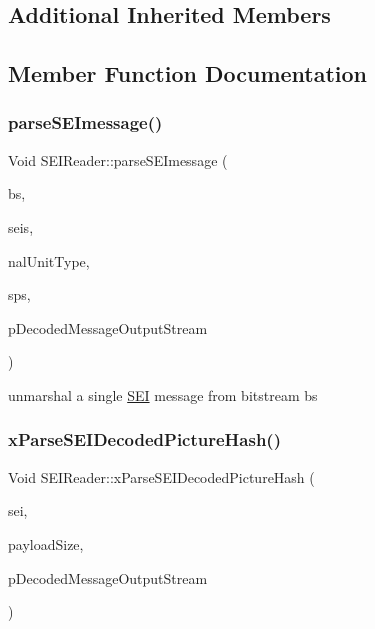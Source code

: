 \subsection*{Additional Inherited Members}


\subsection{Member Function Documentation}
\mbox{\label{class_s_e_i_reader_aef2fb8032997b770594af56676ee34be}} 
\subsubsection{\texorpdfstring{parse\+S\+E\+Imessage()}{parseSEImessage()}}
{\footnotesize\ttfamily Void S\+E\+I\+Reader\+::parse\+S\+E\+Imessage (\begin{DoxyParamCaption}\item[{\hyperlink{class_t_com_input_bitstream}{T\+Com\+Input\+Bitstream} $\ast$}]{bs,  }\item[{S\+E\+I\+Messages \&}]{seis,  }\item[{const Nal\+Unit\+Type}]{nal\+Unit\+Type,  }\item[{const \hyperlink{class_t_com_s_p_s}{T\+Com\+S\+PS} $\ast$}]{sps,  }\item[{std\+::ostream $\ast$}]{p\+Decoded\+Message\+Output\+Stream }\end{DoxyParamCaption})}

unmarshal a single \hyperlink{class_s_e_i}{S\+EI} message from bitstream bs \mbox{\label{class_s_e_i_reader_ac7e9c9932d386e42e60a7b27a9dc42df}} 
\subsubsection{\texorpdfstring{x\+Parse\+S\+E\+I\+Decoded\+Picture\+Hash()}{xParseSEIDecodedPictureHash()}}
{\footnotesize\ttfamily Void S\+E\+I\+Reader\+::x\+Parse\+S\+E\+I\+Decoded\+Picture\+Hash (\begin{DoxyParamCaption}\item[{\hyperlink{class_s_e_i_decoded_picture_hash}{S\+E\+I\+Decoded\+Picture\+Hash} \&}]{sei,  }\item[{U\+Int}]{payload\+Size,  }\item[{std\+::ostream $\ast$}]{p\+Decoded\+Message\+Output\+Stream }\end{DoxyParamCaption})\hspace{0.3cm}{\ttfamily [protected]}}

